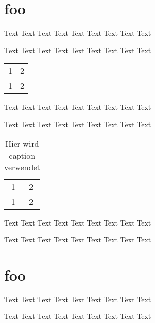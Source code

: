 \documentclass[captions=tableheading,parskip=full]{scrartcl}
\begin{document}
\section{foo}

Text Text Text Text Text Text Text Text Text

Text Text Text Text Text Text Text Text Text

\begin{center}


\begin{tabular}{cc}

\hline

1 & 2 \\

1 & 2 \\

\hline

\end{tabular}

\end{center}

Text Text Text Text Text Text Text Text Text

Text Text Text Text Text Text Text Text Text

\begin{table}[!ht]\centering

\caption{Hier wird caption verwendet}

\begin{tabular}{cc}

\hline

1 & 2 \\

1 & 2 \\

\hline

\end{tabular}

\end{table}

Text Text Text Text Text Text Text Text Text

Text Text Text Text Text Text Text Text Text

\section{foo}

Text Text Text Text Text Text Text Text Text

Text Text Text Text Text Text Text Text Text
\end{document}

